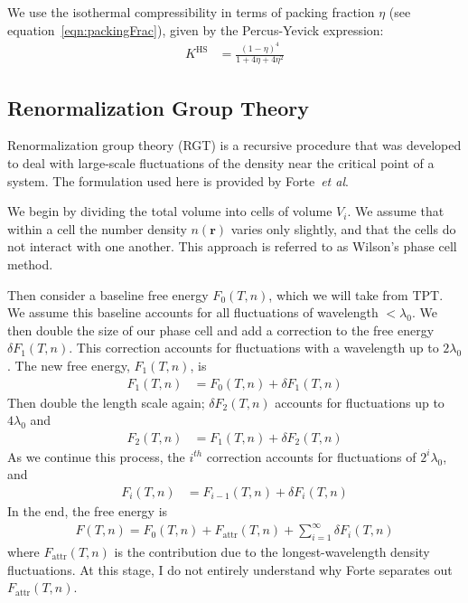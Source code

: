 \documentclass[letterpaper,twocolumn,amsmath,amssymb,prb]{revtex4-1}
\newcommand{\rr}{\ensuremath{\mathbf{r}}}
\newcommand{\Fattr}{\ensuremath{F_\text{attr}(T,n)}}
\begin{document}
We use the isothermal compressibility in terms of packing fraction
$\eta$ (see equation~\ref{eqn:packingFrac}), given by the Percus-Yevick expression:\cite{Barker76}
\begin{align}
  K^\text{HS} &= \frac{\left(1 - \eta\right)^4}{1 + 4\eta + 4\eta^2}
\end{align}

\subsection{Renormalization Group Theory}\label{subsec:RGT}
Renormalization group theory (RGT) is a recursive procedure that was
developed to deal with large-scale fluctuations of the density
near the critical point of a system. The formulation used here is
provided by Forte~\textit{et al}.\cite{Forte11}

We begin by dividing the total volume into cells of volume $V_i$. We
assume that within a cell the number density $n(\rr)$ varies only slightly, and that the
cells do not interact with one another. This approach is referred to as Wilson's
phase cell method.\cite{Ramana12}

Then consider a baseline free energy $F_0(T,n)$, which we will take
from TPT. We assume this baseline accounts for all fluctuations of
wavelength $ < \lambda_0$. We then double the size of our phase cell
and add a correction to the free energy $\delta F_1(T,n)$. This
correction accounts for fluctuations with a wavelength up to
$2\lambda_0$. The new free energy, $F_1(T,n)$, is
\begin{align}
  F_1(T,n) &= F_0(T,n) + \delta F_1(T,n)
\end{align}
Then double the length scale again; $\delta F_2(T,n)$ accounts for
fluctuations up to $4\lambda_0$ and
\begin{align}
  F_2(T,n) &= F_1(T,n) + \delta F_2(T,n)
\end{align}
As we continue this process, the $i^{th}$ correction accounts for
fluctuations of $2^i\lambda_0$, and
\begin{align}
  F_i(T,n) &= F_{i-1}(T,n) + \delta F_i(T,n)
\end{align}
In the end, the free energy is
\begin{align}
  F(T,n) = F_0(T,n) + \Fattr + \sum_{i=1}^\infty\delta F_i(T,n)
\end{align}
where $\Fattr$ is the contribution due to the longest-wavelength
density fluctuations. At this stage, I do not entirely understand why
Forte separates out $\Fattr$.
\end{document}
